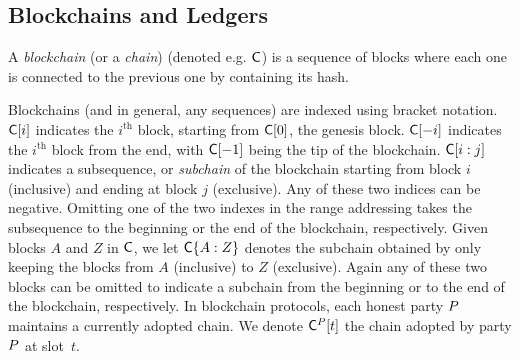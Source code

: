 


\subsection{Blockchains and Ledgers}
A \emph{blockchain} (or a \emph{chain}) (denoted e.g. $\mathsf{C}$)  is a sequence
of blocks where each one is connected to the previous one by containing its
hash.

Blockchains (and in general, any sequences) are indexed using bracket notation.
$\mathsf{C}[i]$ indicates the $i^{\text{th}}$ block, starting from $\mathsf{C}[0]$, the
genesis block. $\mathsf{C}[-i]$ indicates the $i^{\text{th}}$ block from the end,
with $\mathsf{C}[-1]$ being the tip of the blockchain. $\mathsf{C}[i:j]$ indicates a
subsequence, or \emph{subchain} of the blockchain starting from block $i$
(inclusive) and ending at block $j$ (exclusive). Any of these two indices can be
negative. Omitting one of the two indexes in the range addressing takes the
subsequence to the beginning or the end of the blockchain, respectively. Given
blocks $A$ and $Z$ in $\mathsf{C}$, we let $\mathsf{C}\{A:Z\}$ denotes the subchain
obtained by only keeping the blocks from $A$ (inclusive) to $Z$ (exclusive).
Again any of these two blocks can be omitted to indicate a subchain from the
beginning or to the end of the blockchain, respectively. In blockchain
protocols, each honest party $P$ maintains a currently adopted chain. We
denote $\mathsf{C}^{P}[t]$ the chain adopted by party $P$ at slot~$t$.

